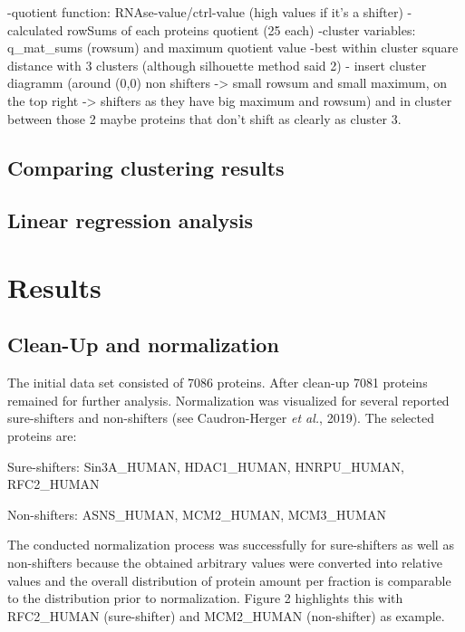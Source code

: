 \documentclass[
]{article}
\begin{document}
-quotient function: RNAse-value/ctrl-value (high values if it's a
shifter) -calculated rowSums of each proteins quotient (25 each)
-cluster variables: q\_mat\_sums (rowsum) and maximum quotient value
-best within cluster square distance with 3 clusters (although
silhouette method said 2) - insert cluster diagramm (around (0,0) non
shifters -\textgreater{} small rowsum and small maximum, on the top
right -\textgreater{} shifters as they have big maximum and rowsum) and
in cluster between those 2 maybe proteins that don't shift as clearly as
cluster 3.

\hypertarget{comparing-clustering-results}{%
\subsection{Comparing clustering
results}\label{comparing-clustering-results}}

\hypertarget{linear-regression-analysis}{%
\subsection{Linear regression
analysis}\label{linear-regression-analysis}}

\newpage

\hypertarget{results}{%
\section{Results}\label{results}}

\hypertarget{clean-up-and-normalization}{%
\subsection{Clean-Up and
normalization}\label{clean-up-and-normalization}}

The initial data set consisted of 7086 proteins. After clean-up 7081
proteins remained for further analysis. Normalization was visualized for
several reported sure-shifters and non-shifters (see Caudron-Herger
\emph{et al.}, 2019). The selected proteins are:

Sure-shifters: Sin3A\_HUMAN, HDAC1\_HUMAN, HNRPU\_HUMAN, RFC2\_HUMAN

Non-shifters: ASNS\_HUMAN, MCM2\_HUMAN, MCM3\_HUMAN

The conducted normalization process was successfully for sure-shifters
as well as non-shifters because the obtained arbitrary values were
converted into relative values and the overall distribution of protein
amount per fraction is comparable to the distribution prior to
normalization. Figure 2 highlights this with RFC2\_HUMAN (sure-shifter)
and MCM2\_HUMAN (non-shifter) as example.
\end{document}
